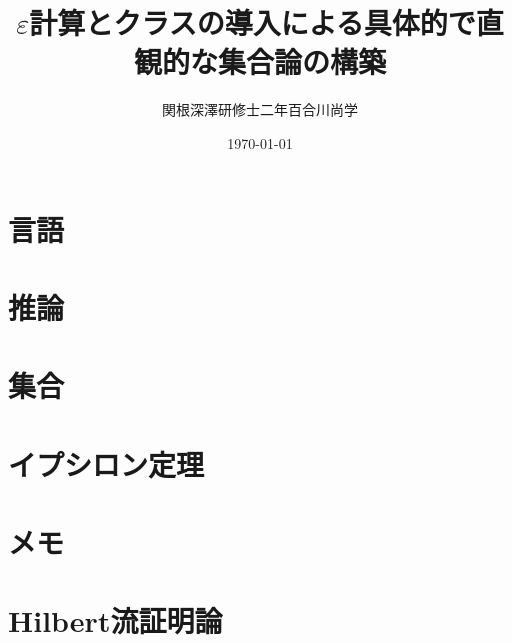 \documentclass[a4j,10.5pt,oneside,openany]{jsbook}
\title{$\varepsilon$計算とクラスの導入による具体的で直観的な集合論の構築}
\author{関根深澤研修士二年百合川尚学}
\date{\today}
\theoremstyle{mystyle}
\begin{document}
\maketitle
\tableofcontents
\frontmatter
\mainmatter




\chapter{言語}
	
	
	

\chapter{推論}
	
	

\chapter{集合}	
	
	
	
	
	
	
	
	
	
	
	
	

\chapter{イプシロン定理}
	
	
	

\chapter{メモ}
	
	

\chapter{Hilbert流証明論}
	


\end{document}
